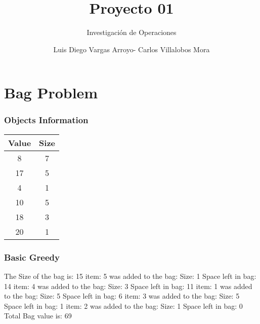 \documentclass[12]{beamer}
\title{Proyecto 01}
\subtitle{Investigación de Operaciones}
\author{Luis Diego Vargas Arroyo- Carlos Villalobos Mora}
\begin{document}
\frame{\titlepage}
\section{Bag Problem}
\begin{frame}
\frametitle{Objects Information}

\begin{center}
\begin{adjustbox}{max width=\textwidth}
\small
\begin{tabular}{ |c|c| }
\hline
    Value     &     Size     \\\hline
\hline
  8  & 7 \\ 
\hline
  17  & 5 \\ 
\hline
  4  & 1 \\ 
\hline
  10  & 5 \\ 
\hline
  18  & 3 \\ 
\hline
  20  & 1 \\ 
\hline
\end{tabular}
\end{adjustbox}
\end{center}

\end{frame}
\begin{frame}
\frametitle{Basic Greedy}

\begin{flushleft}
\small
\small
\large 
The Size of the bag is:  15 
\newline 
\newline 
\newline 
\small 
item: 5 was added to the bag: Size: 1  Space left in bag: 14 
\newline
item: 4 was added to the bag: Size: 3  Space left in bag: 11 
\newline
item: 1 was added to the bag: Size: 5  Space left in bag: 6 
\newline
item: 3 was added to the bag: Size: 5  Space left in bag: 1 
\newline
item: 2 was added to the bag: Size: 1  Space left in bag: 0 
\newline
\newline 
\large 
Total Bag value is:  69 
\end{flushleft}

\end{frame}
\end{document}
